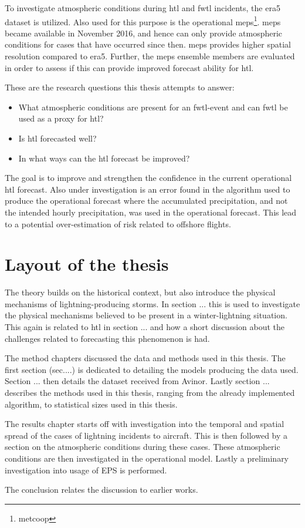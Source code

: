 To investigate atmospheric conditions during \acrshort{htl} and \acrshort{fwtl} incidents, the \acrfull{era5} dataset is utilized. Also used for this purpose is the operational \acrfull{meps}\footnote{\acrfull{metcoop}}. \acrshort{meps} became available in November 2016, and hence can only provide atmospheric conditions for cases that have occurred since then. \acrshort{meps} provides higher spatial resolution compared to \acrshort{era5}. Further, the \acrshort{meps} ensemble members are evaluated in order to assess if this can provide improved forecast ability for \acrshort{htl}.

These are the research questions this thesis attempts to answer:
\begin{itemize}	
    \item What atmospheric conditions are present for an \acrshort{fwtl}-event and can \acrshort{fwtl} be used as a proxy for \acrshort{htl}? 
    \item Is \acrshort{htl} forecasted well?
    \item In what ways can the \acrshort{htl} forecast be improved?
\end{itemize}

The goal is to improve and strengthen the confidence in the current operational \acrshort{htl} forecast. Also under investigation is an error found in the algorithm used to produce the operational forecast where the accumulated precipitation, and not the intended hourly precipitation, was used in the operational forecast. This lead to a potential over-estimation of risk related to offshore flights.

\section{Layout of the thesis}

The theory builds on the historical context, but also introduce the physical mechanisms of lightning-producing storms. In section ... this is used to investigate the physical mechanisms believed to be present in a winter-lightning situation. This again is related to \acrfull{htl} in section ... and how a short discussion about the challenges related to forecasting this phenomenon is had.

The method chapters discussed the data and methods used in this thesis. The first section (sec....) is dedicated to detailing the models producing the data used. Section ... then details the dataset received from Avinor. Lastly section ... describes the methods used in this thesis, ranging from the already implemented algorithm, to statistical sizes used in this thesis.

The results chapter starts off with investigation into the temporal and spatial spread of the cases of lightning incidents to aircraft. This is then followed by a section on the atmospheric conditions during these cases. These atmospheric conditions are then investigated in the operational model. Lastly a preliminary investigation into usage of EPS is performed.

The conclusion relates the discussion to earlier works.



